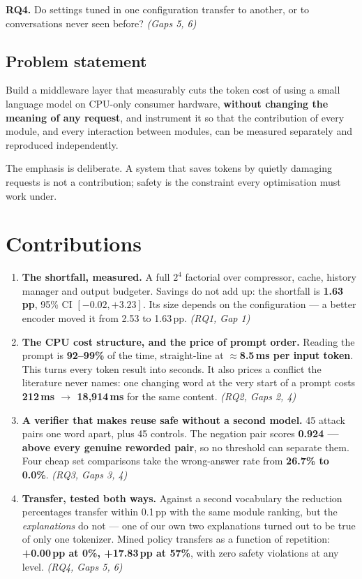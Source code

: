 \documentclass[11pt,a4paper]{article}
\begin{document}
\textbf{RQ4.} Do settings tuned in one configuration transfer to another, or to
conversations never seen before? \emph{(Gaps 5, 6)}

\subsection*{Problem statement}
\begin{tcolorbox}[colback=soft,colframe=accent,boxrule=0pt,leftrule=2.5pt,arc=0pt]
Build a middleware layer that measurably cuts the token cost of using a small language
model on CPU-only consumer hardware, \textbf{without changing the meaning of any
request}, and instrument it so that the contribution of every module, and every
interaction between modules, can be measured separately and reproduced independently.
\end{tcolorbox}
The emphasis is deliberate. A system that saves tokens by quietly damaging requests is
not a contribution; safety is the constraint every optimisation must work under.

\section{Contributions}

\begin{enumerate}[label=\textbf{C\arabic*.}]
\item \textbf{The shortfall, measured.} A full $2^4$ factorial over compressor,
cache, history manager and output budgeter. Savings do not add up: the shortfall is
\textbf{1.63\,pp}, 95\% CI $[-0.02,+3.23]$. Its size depends on the configuration ---
a better encoder moved it from 2.53 to 1.63\,pp. \emph{(RQ1, Gap 1)}

\item \textbf{The CPU cost structure, and the price of prompt order.} Reading the
prompt is \textbf{92--99\%} of the time, straight-line at \textbf{$\approx$8.5\,ms per
input token}. This turns every token result into seconds. It also prices a conflict
the literature never names: one changing word at the very start of a prompt costs
\textbf{212\,ms $\rightarrow$ 18{,}914\,ms} for the same content. \emph{(RQ2, Gaps 2, 4)}

\item \textbf{A verifier that makes reuse safe without a second model.} 45 attack
pairs one word apart, plus 45 controls. The negation pair scores \textbf{0.924 ---
above every genuine reworded pair}, so no threshold can separate them. Four cheap set
comparisons take the wrong-answer rate from \textbf{26.7\% to 0.0\%}. \emph{(RQ3,
Gaps 3, 4)}

\item \textbf{Transfer, tested both ways.} Against a second vocabulary the reduction
percentages transfer within 0.1\,pp with the same module ranking, but the
\emph{explanations} do not --- one of our own two explanations turned out to be true of
only one tokenizer. Mined policy transfers as a function of repetition:
\textbf{+0.00\,pp at 0\%, +17.83\,pp at 57\%}, with zero safety violations at any
level. \emph{(RQ4, Gaps 5, 6)}
\end{enumerate}
\end{document}
